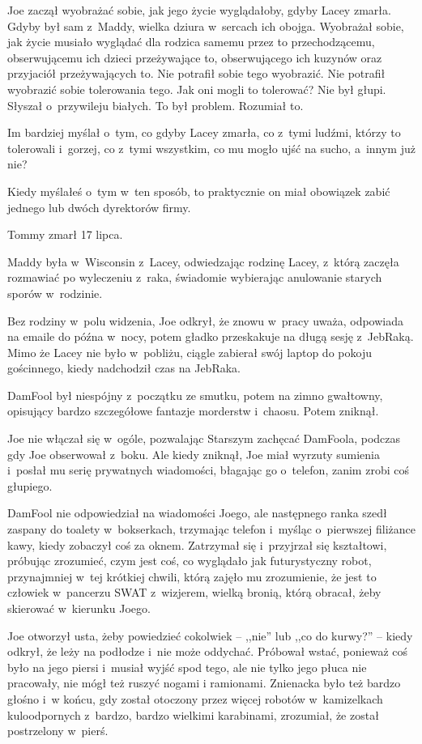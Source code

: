 \documentclass[oneside,polish,11pt,sfheadings]{mwbk}
\begin{document}
Joe zaczął wyobrażać sobie, jak jego życie wyglądałoby, gdyby Lacey
zmarła. Gdyby był sam z~Maddy, wielka dziura w~sercach ich obojga.
Wyobrażał sobie, jak życie musiało wyglądać dla rodzica samemu przez to
przechodzącemu, obserwującemu ich dzieci przeżywające to, obserwującego
ich kuzynów oraz przyjaciół przeżywających to. Nie potrafił sobie tego
wyobrazić. Nie potrafił wyobrazić sobie tolerowania tego. Jak oni mogli
to tolerować? Nie był głupi. Słyszał o~przywileju białych. To był
problem. Rozumiał to.

Im bardziej myślał o~tym, co gdyby Lacey zmarła, co z~tymi ludźmi,
którzy to tolerowali i~gorzej, co z~tymi wszystkim, co mu mogło ujść na
sucho, a~innym już nie?

Kiedy myślałeś o~tym w~ten sposób, to praktycznie on miał obowiązek
zabić jednego lub dwóch dyrektorów firmy.

Tommy zmarł 17 lipca.

Maddy była w~Wisconsin z~Lacey, odwiedzając rodzinę Lacey, z~którą
zaczęła rozmawiać po wyleczeniu z~raka, świadomie wybierając anulowanie
starych sporów w~rodzinie.

Bez rodziny w~polu widzenia, Joe odkrył, że znowu w~pracy uważa,
odpowiada na emaile do późna w~nocy, potem gładko przeskakuje na długą
sesję z~JebRaką. Mimo że Lacey nie było w~pobliżu, ciągle zabierał swój
laptop do pokoju gościnnego, kiedy nadchodził czas na JebRaka.

DamFool był niespójny z~początku ze smutku, potem na zimno gwałtowny,
opisujący bardzo szczegółowe fantazje morderstw i~chaosu. Potem zniknął.

Joe nie włączał się w~ogóle, pozwalając Starszym zachęcać DamFoola,
podczas gdy Joe obserwował z~boku. Ale kiedy zniknął, Joe miał wyrzuty
sumienia i~posłał mu serię prywatnych wiadomości, błagając go o~telefon,
zanim zrobi coś głupiego.

DamFool nie odpowiedział na wiadomości Joego, ale następnego ranka szedł
zaspany do toalety w~bokserkach, trzymając telefon i~myśląc o~pierwszej
filiżance kawy, kiedy zobaczył coś za oknem. Zatrzymał się i~przyjrzał
się kształtowi, próbując zrozumieć, czym jest coś, co wyglądało jak
futurystyczny robot, przynajmniej w~tej krótkiej chwili, którą zajęło mu
zrozumienie, że jest to człowiek w~pancerzu SWAT z~wizjerem, wielką
bronią, którą obracał, żeby skierować w~kierunku Joego.

Joe otworzył usta, żeby powiedzieć cokolwiek -- ,,nie'' lub ,,co do
kurwy?'' -- kiedy odkrył, że leży na podłodze i~nie może oddychać.
Próbował wstać, ponieważ coś było na jego piersi i~musiał wyjść spod
tego, ale nie tylko jego płuca nie pracowały, nie mógł też ruszyć nogami
i ramionami. Znienacka było też bardzo głośno i~w końcu, gdy został
otoczony przez więcej robotów w~kamizelkach kuloodpornych z~bardzo,
bardzo wielkimi karabinami, zrozumiał, że został postrzelony w~pierś.
\end{document}
